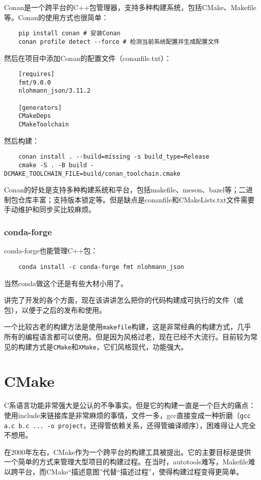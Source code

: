 Conan是一个跨平台的C++包管理器，支持多种构建系统，包括CMake、Makefile等。Conan的使用方式也很简单：
\begin{lstlisting}
    pip install conan # 安装Conan
    conan profile detect --force # 检测当前系统配置并生成配置文件
\end{lstlisting}
然后在项目中添加Conan的配置文件（conanfile.txt）：
\begin{lstlisting}
    [requires]
    fmt/9.0.0
    nlohmann_json/3.11.2

    [generators]
    CMakeDeps
    CMakeToolchain
\end{lstlisting}
然后构建：
\begin{lstlisting}
    conan install . --build=missing -s build_type=Release
    cmake -S . -B build -DCMAKE_TOOLCHAIN_FILE=build/conan_toolchain.cmake
\end{lstlisting}

Conan的好处是支持多种构建系统和平台，包括makefile、meson、bazel等；二进制包仓库丰富；支持版本锁定等。但是缺点是conanfile和CMakeLists.txt文件需要手动维护和同步买比较麻烦。

\subsubsection{conda-forge}

conda-forge也能管理C++包：
\begin{lstlisting}
    conda install -c conda-forge fmt nlohmann_json
\end{lstlisting}
当然conda做这个还是有些大材小用了。

讲完了开发的各个方面，现在该讲讲怎么把你的代码构建成可执行的文件（或包），以便于之后的发布和使用。

一个比较古老的构建方法是使用\texttt{makefile}构建，这是非常经典的构建方式，几乎所有的编程语言都可以使用。但是因为风格过老，现在已经不大流行。目前较为常见的构建方式是\texttt{CMake}和\texttt{XMake}，它们风格现代，功能强大。

\section{CMake}

C系语言功能非常强大是公认的不争事实。但是它的构建一直是一个巨大的痛点：使用include来链接库是非常麻烦的事情，文件一多，gcc直接变成一种折磨（\texttt{gcc a.c b.c ... -o project}，还得管依赖关系，还得管编译顺序），困难得让人完全不想用。

在2000年左右，CMake作为一个跨平台的构建工具被提出。它的主要目标是提供一个简单的方式来管理大型项目的构建过程。在当时，autotools难写，Makefile难以跨平台，而CMake“描述意图”代替“描述过程”，使得构建过程变得更简单。

